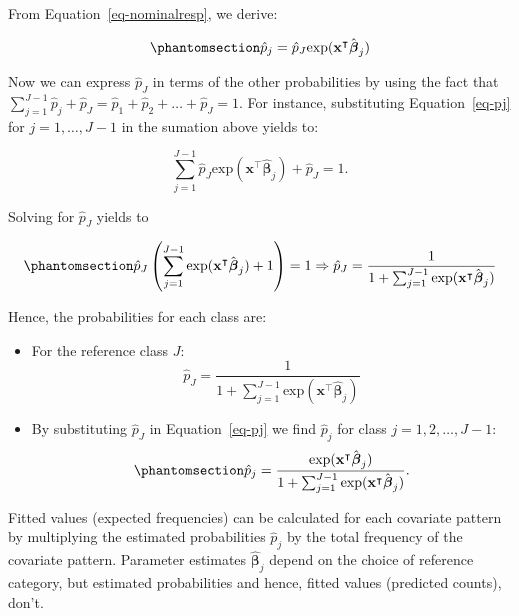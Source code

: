 \documentclass[
  letterpaper,
  DIV=11,
  numbers=noendperiod]{scrartcl}
\begin{document}
From Equation~\ref{eq-nominalresp}, we derive:

\begin{equation}\phantomsection\label{eq-pj}{
\hat{p}_j=\hat{p}_J\mathrm{exp}(\mathbf{x}^\intercal\hat{\boldsymbol{\beta}}_j) 
}\end{equation}

Now we can express \(\hat{p}_J\) in terms of the other probabilities by
using the fact that
\(\sum_{j=1}^{J-1} \hat{p}_j + \hat{p}_J = \hat{p}_1+\hat{p}_2+\dots+\hat{p}_J= 1.\)
For instance, substituting Equation~\ref{eq-pj} for \(j = 1,\ldots,J-1\)
in the sumation above yields to:

\[
\sum_{j=1}^{J-1} \hat{p}_J\mathrm{exp}(\mathbf{x}^\intercal\hat{\boldsymbol{\beta}}_j) + \hat{p}_J = 1.
\]

Solving for \(\hat{p}_J\) yields to

\begin{equation}\phantomsection\label{eq-p1hat}{
\hat{p}_J\left(\sum_{j=1}^{J-1} \mathrm{exp}(\mathbf{x}^\intercal\hat{\boldsymbol{\beta}}_j) + 1\right) = 1 \\ \Rightarrow\hat{p}_J = \dfrac{1}{1+\sum_{j=1}^{J-1} \mathrm{exp}(\mathbf{x}^\intercal\hat{\boldsymbol{\beta}}_j)}
}\end{equation}

Hence, the probabilities for each class are:

\begin{itemize}
\item
  For the reference class \(J:\)\[
      \hat{p}_J = \dfrac{1}{1+\sum_{j=1}^{J-1} \mathrm{exp}(\mathbf{x}^\intercal\hat{\boldsymbol{\beta}}_j)}
      \]
\item
  By substituting \(\hat{p}_J\) in Equation~\ref{eq-pj} we find
  \(\hat{p}_j\) for class \(j = 1,2,\ldots,J-1:\)
  \begin{equation}\phantomsection\label{eq-pjhat}{\hat{p}_j=\dfrac{\exp(\mathbf{x}^\intercal\hat{\boldsymbol{\beta}}_j)}{1+\sum_{j=1}^{J-1}\exp(\mathbf{x}^\intercal\hat{\boldsymbol{\beta}}_j)}.}\end{equation}
\end{itemize}

Fitted values (expected frequencies) can be calculated for each
covariate pattern by multiplying the estimated probabilities
\(\hat{p}_j\) by the total frequency of the covariate pattern. Parameter
estimates \(\hat{\boldsymbol{\beta}}_j\) depend on the choice of
reference category, but estimated probabilities and hence, fitted values
(predicted counts), don't.
\end{document}
